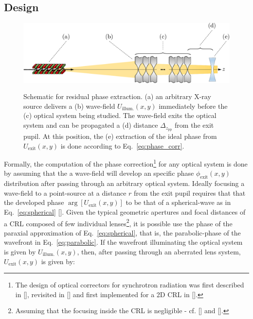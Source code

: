 \begin{refsection}
\subsection{Design}\label{sec:design}
\begin{figure}[t]
        \centering
        {\includegraphics[width=0.6\linewidth]{figures/ch06/phase_extraction.pdf}}
        \caption[Schematic for phase correction calculation]{Schematic for residual phase extraction. (a) an arbitrary X-ray source delivers a (b) wave-field $U_{\text{illum.}}(x,y)$ immediately before the (c) optical system being studied. The wave-field exits the optical system and can be propagated a (d) distance $\Delta_{z_\text{pp}}$ from the exit pupil. At this position, the (e) extraction of the ideal phase from $U_{\text{exit}}(x,y)$ is done according to Eq.~\ref{eq:phase_corr}.}\label{fig:phase_extraction}
\end{figure}
Formally, the computation of the phase correction\footnote{The design of optical correctors for synchrotron radiation was first described in [\cite[\textit{§2}]{Chubar1999}], revisited in [\cite{Chubar2001b}] and first implemented for a 2D CRL in [\cite{Seiboth2017}].} for any optical system is done by assuming that the a wave-field will develop an specific phase $\phi_{\text{exit}}(x,y)$ distribution after passing through an arbitrary optical system. Ideally focusing a wave-field to a point-source at a distance $r$ from the exit pupil requires that that the developed phase $\arg [U_{\text{exit}}(x,y)]$ to be that of a spherical-wave as in Eq.~\ref{eq:spherical} [\cite{Chubar1999}]. Given the typical geometric apertures and focal distances of a CRL composed of few individual lenses\footnote{Assuming that the focusing inside the CRL is negligible - cf. [\cite{Schroer2005}] and [\cite[\textit{\S6}]{Seiboth2018}].}, it is possible use the phase of the paraxial approximation of Eq.~\ref{eq:spherical}, that is, the parabolic-phase of the wavefront in Eq.~\ref{eq:parabolic}. If the wavefront illuminating the optical system is given by $U_{\text{illum.}}(x,y)$, then, after passing through an aberrated lens system, $U_{\text{exit}}(x,y)$ is given by:

\end{refsection}
